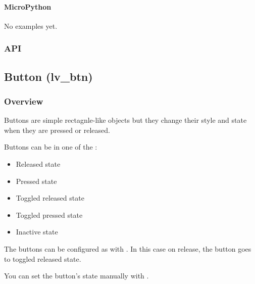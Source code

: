 \documentclass[letterpaper,10pt,english]{sphinxmanual}
\begin{document}
\paragraph{MicroPython}
\label{\detokenize{object-types/bar:micropython}}
No examples yet.


\subsubsection{API}
\label{\detokenize{object-types/bar:api}}

\subsection{Button (lv\_btn)}
\label{\detokenize{object-types/btn:button-lv-btn}}\label{\detokenize{object-types/btn::doc}}

\subsubsection{Overview}
\label{\detokenize{object-types/btn:overview}}
Buttons are simple rectagnle-like objects but they change their style and state when they are pressed or released.

Buttons can be in one of the :
\begin{itemize}
\item {} 
 Released state

\item {} 
 Pressed state

\item {} 
 Toggled released state

\item {} 
 Toggled pressed state

\item {} 
 Inactive state

\end{itemize}

The buttons can be configured as  with . In this case on release, the button goes to toggled released state.

You can set the button’s state manually with .
\end{document}
